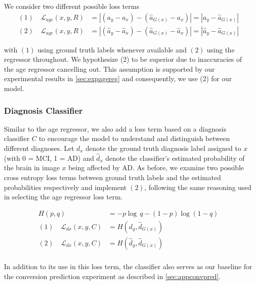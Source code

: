 We consider two different possible loss terms 
\begin{equation}
	\begin{split}
		(1) \quad \mathcal{L}_{age}(x, y, R) & = 
		| (a_y - a_x) - (\hat a_{G(x)} - a_x) | =
		| a_y - \hat a_{G(x)} | \\[8pt]
		(2) \quad \mathcal{L}_{age}(x, y, R) & =
		| (\hat a_y - \hat a_x) - (\hat a_{G(x)} - \hat a_x) | = 
		| \hat a_y - \hat a_{G(x)} |
	\end{split}
\end{equation}

with $(1)$ using ground truth labels whenever available and $(2)$ using the regressor throughout. We hypothesize (2) to be superior due to inaccuracies of the age regressor cancelling out. This assumption is supported by our experimental results in \autoref{sec:expagereg} and consequently, we use (2) for our model.

\subsubsection*{Diagnosis Classifier}
Similar to the age regressor, we also add a loss term based on a diagnosis classifier $C$ to encourage the model to understand and distinguish between different diagnoses. Let $d_x$ denote the ground truth diagnosis label assigned to $x$ (with 0 = MCI, 1 = AD) and $\hat d_x$ denote the classifier's estimated probability of the brain in image $x$ being affected by AD. As before, we examine two possible cross entropy loss terms between ground truth labels and the estimated probabilities respectively and implement $(2)$, following the same reasoning used in selecting the age regressor loss term.

\begin{equation}
	\begin{split}
		H(p, q) & = -p \log\, q - (1 - p)\log(1 - q) \\[8pt]
		(1) \quad \mathcal{L}_{dx}(x, y, C) & = 
		H(d_y, \hat d_{G(x)}) \\[8pt]
		(2) \quad \mathcal{L}_{dx}(x, y, C) & =
		H(\hat d_y, \hat d_{G(x)}) \\[8pt]
	\end{split}
\end{equation}

In addition to its use in this loss term, the classifier also serves as our baseline for the conversion prediction experiment as described in \autoref{sec:appconvpred}.

